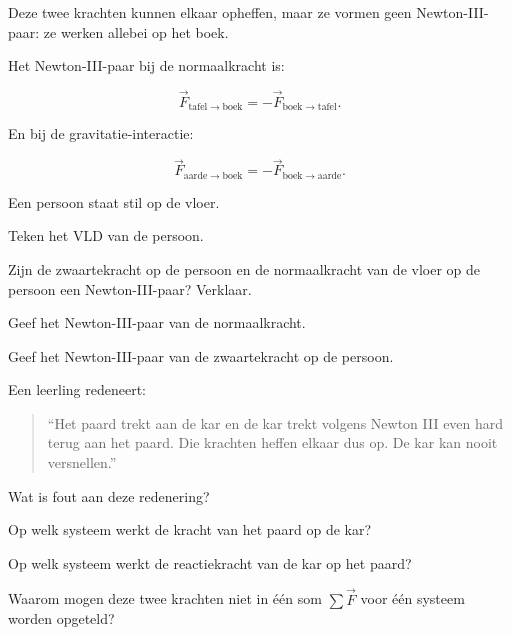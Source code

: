 \documentclass{ximera}
\begin{document}
Deze twee krachten kunnen elkaar opheffen, maar ze vormen geen
Newton-III-paar: ze werken allebei op het boek.

Het Newton-III-paar bij de normaalkracht is:

\[
\vec F_{\mathrm{tafel}\rightarrow\mathrm{boek}}
=
-\vec F_{\mathrm{boek}\rightarrow\mathrm{tafel}}.
\]

En bij de gravitatie-interactie:

\[
\vec F_{\mathrm{aarde}\rightarrow\mathrm{boek}}
=
-\vec F_{\mathrm{boek}\rightarrow\mathrm{aarde}}.
\]


\begin{oefening}{\oefU\ESS}

Een persoon staat stil op de vloer.

\begin{question}
Teken het VLD van de persoon.
\end{question}

\begin{question}
Zijn de zwaartekracht op de persoon en de normaalkracht van de vloer
op de persoon een Newton-III-paar? Verklaar.
\end{question}

\begin{question}
Geef het Newton-III-paar van de normaalkracht.
\end{question}

\begin{question}
Geef het Newton-III-paar van de zwaartekracht op de persoon.
\end{question}

\end{oefening}


\begin{oefening}{\oefU\ESS}

Een leerling redeneert:

\begin{quote}
``Het paard trekt aan de kar en de kar trekt volgens Newton III even
hard terug aan het paard. Die krachten heffen elkaar dus op. De kar kan
nooit versnellen.''
\end{quote}

\begin{question}
Wat is fout aan deze redenering?
\end{question}

\begin{question}
Op welk systeem werkt de kracht van het paard op de kar?
\end{question}

\begin{question}
Op welk systeem werkt de reactiekracht van de kar op het paard?
\end{question}

\begin{question}
Waarom mogen deze twee krachten niet in één som
$\sum\vec F$ voor één systeem worden opgeteld?
\end{question}

\end{oefening}
\end{document}
